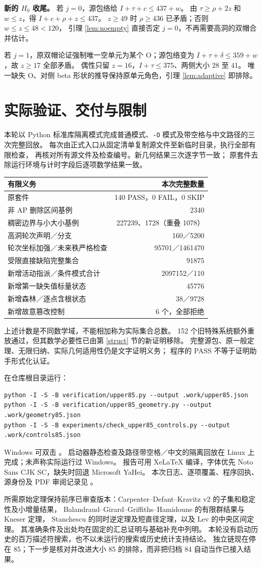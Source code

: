 \documentclass[11pt,a4paper]{article}
\begin{document}
\textbf{新的 $H_0$ 收尾。} 若 $j=0$，源包络给 $I+\tau+c\le437+w$。
由 $\tau\ge\rho+2z$ 和 $w\le z$，得 $I+c+\rho+z\le437$。
$z\ge49$ 时 $\rho\ge436$ 已矛盾；否则 $w\le z\le48<120$，
引理 \ref{lem:noempty} 直接否定 $j=0$，不再需要高洞的双帽合并估计。

若 $j=1$，原双帽论证强制唯一空单元为某个 O；源包络变为
$I+\tau+\delta\le359+w$，故 $z\ge17$ 全部矛盾。
偶性只留 $z=16$，$I+\tau\le375$、两侧大小 28 至 41。
唯一缺失 O、对侧 beta 形状的推导保持原单元角色，引理 \ref{lem:adaptive} 即排除。

\clearpage
\section{实际验证、交付与限制}\label{finite}
本轮以 Python 标准库隔离模式完成普通模式、\texttt{-O} 模式及带空格与中文路径的三次完整回放。
每次由正式入口从固定清单复制源文件至新临时目录，执行全部有限检查，
再核对所有源文件及检查编号。新几何结果三次逐字节一致；
原套件去除运行环境与计时字段后逐项数学结果一致。
\begin{center}\small
\begin{tabular}{lr}
\toprule 有限义务 & 本次完整数量\\\midrule
原套件 &140 PASS，0 FAIL，0 SKIP\\
非 AP 删除区间基例 &2340\\
稠密边界与小大小基例 &227239、1728（重叠 1078）\\
高洞轮次声明／分支 &160／5200\\
轮次坐标加强／未来秩严格检查 &95701／1461470\\
受限直接缺陷完整集合 &91875\\
新增活动指派／条件模式合计 &2097152／110\\
新增第一缺失值标量状态 &45776\\
新增森林／逐点含根状态 &38／9728\\
新增故意篡改控制 &6 个，全部拒绝\\\bottomrule
\end{tabular}
\end{center}
上述计数是不同数学域，不能相加称为实际集合总数。
152 个旧特殊系统额外重放通过，但其数学必要性已由第 \ref{struct} 节的新证明移除。
完整源包、原一般定理、无限归纳、实际几何适用性仍是文字证明义务；
程序的 PASS 不等于证明助手形式化认证。

在仓库根目录运行：
\begin{verbatim}
python -I -S -B verification/upper85.py --output .work/upper85.json
python -I -S -B verification/upper85_geometry.py --output .work/geometry85.json
python -I -S -B experiments/check_upper85_controls.py --output .work/controls85.json
\end{verbatim}
Windows 可双击 。
启动器静态检查及路径带空格／中文的隔离回放在 Linux 上完成；未声称实际运行过 Windows。
报告可用 XeLaTeX 编译，字体优先 Noto Sans CJK SC，缺失时回退 Microsoft YaHei。
本次日志、逐项覆盖、程序回执、源身份及 PDF 审阅记录见
。

所需原始定理保持前序已审查版本：Carpenter--Defant--Kravitz v2 的子集和稳定性及小增量结果，
Balandraud--Girard--Griffiths--Hamidoune 的有限群结果与 Kneser 定理，
Stanchescu 的同时逆定理及短直径定理，以及 Lev 的中央区间定理。
其准确条件及出处均在固定的汇总证明与基础补充中列明。
本轮没有启动历史的百万描述符搜索，也不以未运行的搜索或历史统计支持结论。
独立链现在停在 85；下一步是核对并改进大小 85 的排除，而非把归档 84 自动当作已接入结果。
\end{document}
